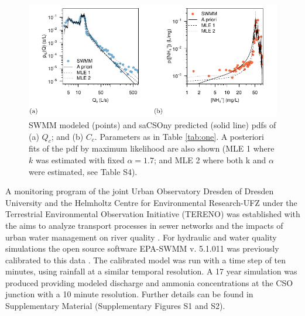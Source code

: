 \documentclass[draft,linenumbers]{agujournal2018}
\begin{document}
\begin{figure}[ht]
 \centering
 \includegraphics[width=30pc]{Fig5.pdf}
 \caption{SWMM modeled (points) and saCSOny predicted (solid line) pdfs of (a) $Q_c$; and (b) $C_c$. Parameters as in Table \ref{tab:one}. A posteriori f\/its of the pdf by maximum likelihood are also shown (MLE 1 where  $k$ was estimated with f\/ixed  $\alpha = 1.7$; and MLE 2 where both k and  $\alpha$ were estimated, see Table S4).}
 \label{figfive}
 \end{figure}
 
A monitoring program of the joint Urban Observatory Dresden of Dresden University and the Helmholtz Centre for Environmental Research-UFZ under the Terrestrial Environmental Observation Initiative (TERENO) was established with the aims to analyze transport processes in sewer networks and the impacts of urban water management on river quality \citep{Wollschl_ger_2016}. For hydraulic and water quality simulations the open source software EPA-SWMM v. 5.1.011 was previously calibrated to this data \citep{Rossmann2010,Kaeseberg_2018}. The calibrated model was run with a time step of ten minutes, using rainfall at a similar temporal resolution. A 17 year simulation was produced providing modeled discharge and ammonia concentrations at the CSO junction with a 10 minute resolution. Further details can be found in Supplementary Material (Supplementary Figures S1 and S2).
 
\end{document}
